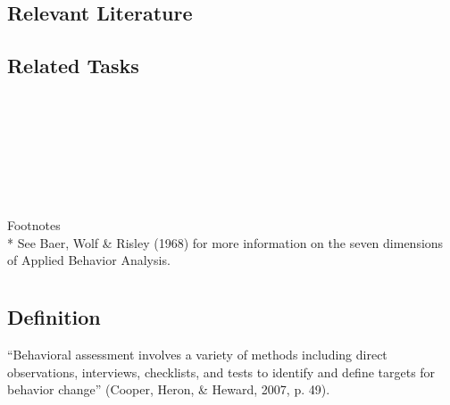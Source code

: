 \subsection{Relevant Literature}
\begin{refsection}
\nocite{test,alang2017police,clayton2018black}
\printbibliography[heading=none]
\end{refsection}
%
\subsection{Related Tasks}
\fourbEleven{}\\
\fouriOne{}\\
\fouriFour{}\\
\fourjOne{}\\
\fourFKSeven{}\\
\fourFKEleven{}\\
\fourFKThirtyThree{}\\
%
Footnotes\\
* See Baer, Wolf \& Risley (1968) for more information on the seven dimensions of Applied Behavior Analysis.
%
%
%
%
%
%
%
%
\section[\fouriThree{}]{\fouriThree{}%
              }
\subsection{Definition}
``Behavioral assessment involves a variety of methods including direct observations, interviews, checklists, and tests to identify and define targets for behavior change'' (Cooper, Heron, \& Heward, 2007, p. 49).

